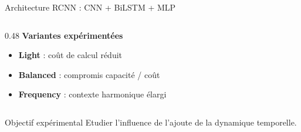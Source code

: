 \begin{frame}{Architecture RCNN : CNN + BiLSTM + MLP}
\begin{columns}[T,onlytextwidth]
		\begin{column}{0.48\textwidth}
			\textbf{Variantes expérimentées}
			\begin{itemize}
				\item \textbf{Light} : coût de calcul réduit
				\item \textbf{Balanced} : compromis capacité / coût
				\item \textbf{Frequency} : contexte harmonique élargi
			\end{itemize}
		\end{column}
	\end{columns}
	
	\vspace{0.2cm}
	
	\begin{block}{Objectif expérimental}
		Etudier l'influence de l'ajoute de la dynamique temporelle.
	\end{block}
\end{frame}

